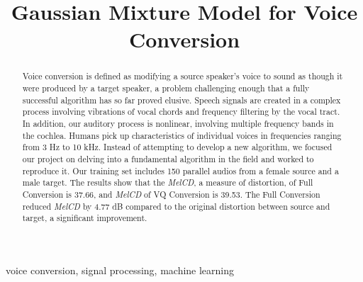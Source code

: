 \documentclass{article}
\title{Gaussian Mixture Model for Voice Conversion}
\begin{document}
%
\maketitle

\begin{abstract}
Voice conversion is defined as modifying a source speaker’s voice to sound as though it were produced by a target speaker, a problem challenging enough  that a fully successful algorithm has so far proved elusive. Speech signals are created in a complex process involving vibrations of vocal chords and frequency filtering by the vocal tract. In addition, our auditory process is nonlinear, involving multiple frequency bands in the cochlea. Humans pick up characteristics of individual voices in frequencies ranging from 3 Hz to 10 kHz. Instead of attempting to develop a new algorithm, we focused our project on delving into a fundamental algorithm in the field and worked to reproduce it. Our training set includes 150 parallel audios from a female source and a male target. The results show that the \textit{MelCD}, a measure of distortion, of Full Conversion is 37.66,  and \textit{MelCD} of VQ Conversion is 39.53. The Full Conversion reduced  \textit{MelCD} by 4.77 dB compared to the original distortion between source and target, a significant improvement. 
\end{abstract}
%
\begin{keywords}
voice conversion, signal processing, machine learning
\end{keywords}










 

\end{document}
